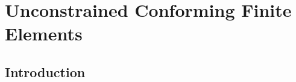 \section{Unconstrained Conforming Finite Elements}\label{Sec:EllipticProblems}
\subsection{Introduction}


